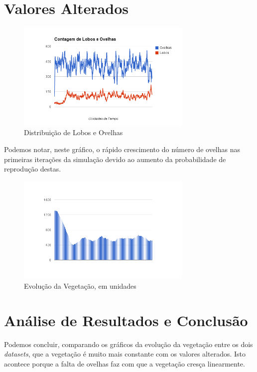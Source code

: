 \documentclass[12pt]{article}
\begin{document}
\section{Valores Alterados}

\begin{figure}[H]
  \centering
  \includegraphics[width=0.75\textwidth]{ovelhaslobos2}
  \caption{Distribuição de Lobos e Ovelhas}
\end{figure}

Podemos notar, neste gráfico, o rápido crescimento do número de ovelhas nas primeiras iterações
da simulação devido ao aumento da probabilidade de reprodução destas.

\begin{figure}[H]
  \centering
  \includegraphics[width=0.75\textwidth]{vegetacao2}
  \caption{Evolução da Vegetação, em unidades}
\end{figure}

\section{Análise de Resultados e Conclusão}

Podemos concluir, comparando os gráficos da evolução da vegetação entre os dois
\textit{datasets}, que a vegetação é muito mais constante com os valores alterados.
Isto acontece porque a falta de ovelhas faz com que a vegetação cresça linearmente.
\end{document}

